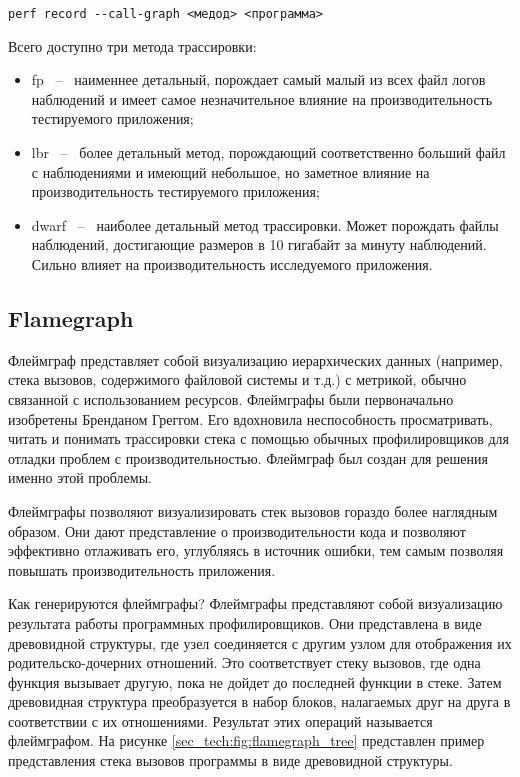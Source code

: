 \begin{lstlisting}[style=CodeListing, label=sec_technologies:code:pref_record_modes, caption={Вызов команды perf record с указанием метода трассировки стека вызовов}]
    perf record --call-graph <медод> <программа>
\end{lstlisting}

Всего доступно три метода трассировки:

\begin{itemize}
    \item fp ~--~ наименнее детальный, порождает самый малый из всех файл логов наблюдений и имеет самое незначительное влияние на производительность тестируемого приложения;
    \item lbr ~--~ более детальный метод, порождающий соответственно больший файл с наблюдениями и имеющий небольшое, но заметное влияние на производительность тестируемого приложения;
    \item dwarf ~--~ наиболее детальный метод трассировки. Может порождать файлы наблюдений, достигающие размеров в 10 гигабайт за минуту наблюдений. Сильно влияет на производительность исследуемого приложения.
\end{itemize}

\subsection{Flamegraph}
Флеймграф представляет собой  визуализацию иерархических данных (например, стека вызовов, 
содержимого файловой системы и т.д.) с метрикой, обычно связанной с использованием ресурсов. 
Флеймграфы были первоначально изобретены Бренданом Греггом. Его вдохновила неспособность просматривать, 
читать и понимать трассировки стека с помощью обычных профилировщиков для отладки проблем с производительностью. 
Флеймграф был создан для решения именно этой проблемы.

Флеймграфы позволяют визуализировать стек вызовов гораздо более наглядным образом. Они дают представление 
о производительности кода и позволяют эффективно отлаживать его, углубляясь в источник ошибки, тем самым позволяя
повышать производительность приложения. 

Как генерируются флеймграфы?
Флеймграфы представляют собой визуализацию результата работы программных профилировщиков. 
Они представлена в виде древовидной структуры, где узел соединяется с другим узлом для отображения их родительско-дочерних отношений. 
Это соответствует стеку вызовов, где одна функция вызывает другую, пока не дойдет до последней функции в стеке. 
Затем древовидная структура преобразуется в набор блоков, налагаемых друг на друга в соответствии с их отношениями. Результат этих операций называется флеймграфом.
На рисунке \ref{sec_tech:fig:flamegraph_tree} представлен пример представления стека вызовов программы в виде древовидной структуры.

